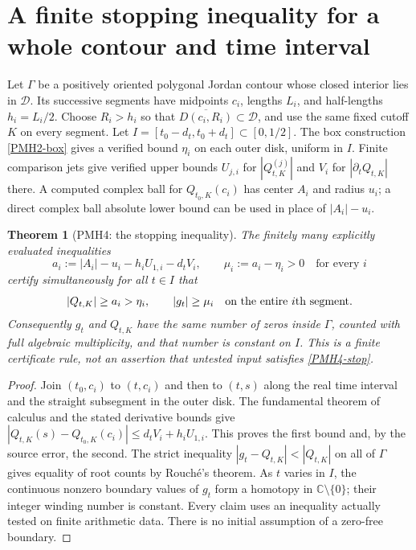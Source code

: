 \documentclass[11pt]{article}
\newtheorem{theorem}{Theorem}
\newcommand{\C}{\mathbb C}
\begin{document}
\section{A finite stopping inequality for a whole contour and time interval}

Let $\Gamma$ be a positively oriented polygonal Jordan contour
whose closed interior lies in $\mathcal D$. Its successive segments
have midpoints $c_i$, lengths $L_i$, and half-lengths $h_i=L_i/2$.
Choose $R_i>h_i$ so that
$\overline{D(c_i,R_i)}\subset\mathcal D$, and use the same fixed
cutoff $K$ on every segment. Let $I=[t_0-d_t,t_0+d_t]\subset[0,1/2]$.
The box construction \eqref{PMH2-box} gives a verified bound $\eta_i$
on each outer disk, uniform in $I$. Finite comparison jets give
verified upper bounds $U_{j,i}$ for $|Q_{t,K}^{(j)}|$ and $V_i$ for
$|\partial_tQ_{t,K}|$ there. A computed complex ball for
$Q_{t_0,K}(c_i)$ has center $A_i$ and radius $u_i$; a direct complex
ball absolute lower bound can be used in place of $|A_i|-u_i$.

\begin{theorem}[PMH4: the stopping inequality]
\label{PMH4}
The finitely many explicitly evaluated inequalities
\begin{equation}\label{PMH4-stop}
 a_i:=|A_i|-u_i-h_iU_{1,i}-d_tV_i,\qquad
 \mu_i:=a_i-\eta_i>0\quad\text{for every }i
\end{equation}
certify simultaneously for all $t\in I$ that
\[
 |Q_{t,K}|\ge a_i>\eta_i,\qquad |g_t|\ge\mu_i
 \quad\hbox{on the entire $i$th segment.}
\]
Consequently $g_t$ and $Q_{t,K}$ have the same number of zeros
inside $\Gamma$, counted with full algebraic multiplicity, and that
number is constant on $I$. This is a finite certificate rule, not an
assertion that untested input satisfies \eqref{PMH4-stop}.
\end{theorem}
\begin{proof}
Join $(t_0,c_i)$ to $(t,c_i)$ and then to $(t,s)$ along the real time
interval and the straight subsegment in the outer disk. The
fundamental theorem of calculus and the stated derivative bounds
give
$|Q_{t,K}(s)-Q_{t_0,K}(c_i)|\le d_tV_i+h_iU_{1,i}$.
This proves the first bound and, by the source error, the second.
The strict inequality $|g_t-Q_{t,K}|<|Q_{t,K}|$ on all of $\Gamma$
gives equality of root counts by Rouch\'e's theorem. As $t$ varies in
$I$, the continuous nonzero boundary values of $g_t$ form a homotopy
in $\C\setminus\{0\}$; their integer winding number is constant.
Every claim uses an inequality actually tested on finite arithmetic
data. There is no initial assumption of a zero-free boundary.
\end{proof}
\end{document}
